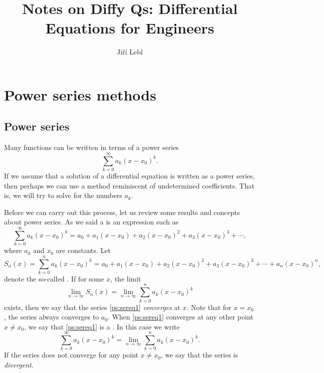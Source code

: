 \documentclass[12pt]{book}
\author{Ji\v{r}\'i Lebl}
\title{Notes on Diffy Qs: Differential Equations for Engineers}
\begin{document}
\setcounter{chapter}{6}


\chapter{Power series methods} \label{ps:chapter}


\section{Power series}


Many functions can be written in terms of a power series
\begin{equation*}
\sum_{k=0}^\infty a_k {(x-x_0)}^k .
\end{equation*}
If we assume that a solution of a differential equation is written as a
power series, then perhaps we can use a method reminiscent of undetermined
coefficients.  That is, we will try to solve for the numbers $a_k$.

\medskip

Before we can carry out this process, let us review some results
and concepts about power series.
As we said a \emph{} is an expression such as
\begin{equation} \label{ps:sereq1}
\sum_{k=0}^\infty a_k {(x-x_0)}^k =
a_0 + 
a_1 (x-x_0) +
a_2 {(x-x_0)}^2 +
a_3 {(x-x_0)}^3 + \cdots,
\end{equation}
where $a_k$ and $x_0$ are constants.  Let
\begin{equation*}
S_n(x) = \sum_{k=0}^n a_k {(x-x_0)}^k =
a_0 + a_1 (x-x_0) + a_2 {(x-x_0)}^2 + a_3 {(x-x_0)}^3 + \cdots + a_n {(x-x_0)}^n ,
\end{equation*}
denote the so-called \emph{}.  If for some $x$,
the limit
\begin{equation*}
\lim_{n\to \infty} S_n(x) = \lim_{n\to\infty} \sum_{k=0}^n a_k {(x-x_0)}^k
\end{equation*}
exists, then we say that the series \eqref{ps:sereq1}
\emph{converges} at $x$.
Note that for $x=x_0$, the series always converges to $a_0$.
When \eqref{ps:sereq1}
converges at any other point $x \not= x_0$,
we say that \eqref{ps:sereq1} is a
\emph{}.  In this case we write
\begin{equation*}
\sum_{k=0}^\infty a_k {(x-x_0)}^k = 
\lim_{n\to\infty} \sum_{k=0}^n a_k {(x-x_0)}^k.
\end{equation*}
If the series does not converge for any point $x \not= x_0$, we say that
the series is \emph{divergent}.
\end{document}
